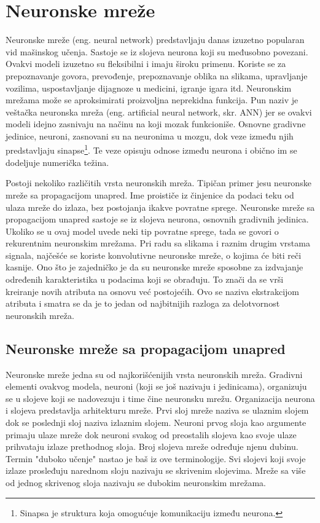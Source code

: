 \chapter{Neuronske mreže}
\label{ch:nn}

Neuronske mreže (eng. neural network) predstavljaju danas izuzetno popularan vid mašinskog učenja. Sastoje se iz slojeva neurona koji su međusobno povezani. Ovakvi modeli izuzetno su fleksibilni i imaju široku primenu.  Koriste se za prepoznavanje govora, prevođenje, prepoznavanje oblika na slikama, upravljanje vozilima, uspostavljanje dijagnoze u medicini, igranje igara itd. Neuronskim mrežama može se aproksimirati proizvoljna neprekidna funkcija. Pun naziv je veštačka neuronska mreža (eng. artificial neural network, skr. ANN) jer se ovakvi modeli idejno zasnivaju na načinu na koji mozak funkcioniše. Osnovne gradivne jedinice, neuroni, zasnovani su na neuronima u mozgu, dok veze između njih predstavljaju sinapse\footnote{Sinapsa je struktura koja omogućuje komunikaciju između neurona.}. Te veze opisuju odnose između neurona i obično im se dodeljuje numerička težina.

\par
Postoji nekoliko različitih vrsta neuronskih mreža. Tipičan primer jesu neuronske mreže sa propagacijom unapred. Ime proističe iz činjenice da podaci teku od ulaza mreže do izlaza, bez postojanja ikakve povratne sprege. Neuronske mreže sa propagacijom unapred sastoje se iz slojeva neurona, osnovnih gradivnih jedinica. Ukoliko se u ovaj model uvede neki tip povratne sprege, tada se govori o rekurentnim neuronskim mrežama. Pri radu sa slikama i raznim drugim vrstama signala, najčešće se koriste konvolutivne neuronske mreže, o kojima će biti reči kasnije. Ono što je zajedničko je da su neuronske mreže sposobne za izdvajanje određenih karakteristika u podacima koji se obrađuju. To znači da se vrši kreiranje novih atributa na osnovu već postojećih. Ovo se naziva ekstrakcijom atributa i smatra se da je to jedan od najbitnijih razloga za delotvornost neuronskih mreža.

\section{Neuronske mreže sa propagacijom unapred}

Neuronske mreže jedna su od najkorišćenijih vrsta neuronskih mreža. Gradivni elementi ovakvog modela, neuroni (koji se još nazivaju i jedinicama), organizuju se u slojeve koji se nadovezuju i time čine neuronsku mrežu. Organizacija neurona i slojeva predstavlja arhitekturu mreže. Prvi sloj mreže naziva se ulaznim slojem dok se poslednji sloj naziva izlaznim slojem. Neuroni prvog sloja kao argumente primaju ulaze mreže dok neuroni svakog od preostalih slojeva kao svoje ulaze prihvataju izlaze prethodnog sloja. Broj slojeva mreže određuje njenu dubinu. Termin "duboko učenje" nastao je baš iz ove terminologije. Svi slojevi koji svoje izlaze prosleđuju narednom sloju nazivaju se skrivenim slojevima.  Mreže sa više od jednog skrivenog sloja nazivaju se dubokim neuronskim mrežama. 


